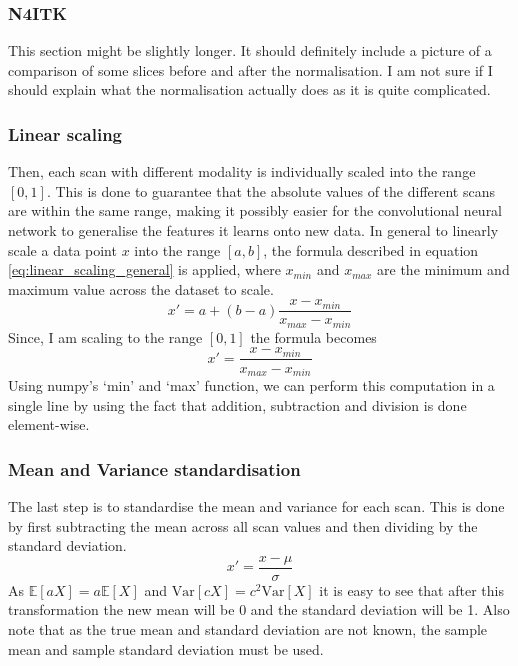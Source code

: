 \documentclass[12pt,a4paper,twoside,openright]{report}
\begin{document}
\subsubsection{N4ITK}
This section might be slightly longer. It should definitely include a picture of a comparison of some slices before and after the normalisation. I am not sure if I should explain what the normalisation actually does as it is quite complicated.

\subsubsection{Linear scaling}
Then, each scan with different modality is individually scaled into the range $[0,1]$. This is done to guarantee that the absolute values of the different scans are within the same range, making it possibly easier for the convolutional neural network to generalise the features it learns onto new data. In general to linearly scale a data point $x$ into the range $[a, b]$, the formula described in equation \ref{eq:linear_scaling_general} is applied, where $x_{min}$ and $x_{max}$ are the minimum and maximum value across the dataset to scale.
\begin{equation}
	\label{eq:linear_scaling_general}
	x' = a + (b - a)\frac{x - x_{min}}{x_{max} - x_{min}}
\end{equation}
Since, I am scaling to the range $[0,1]$ the formula becomes
\begin{equation}
	x' = \frac{x - x_{min}}{x_{max} - x_{min}}
\end{equation}
Using numpy's `min' and `max' function, we can perform this computation in a single line by using the fact that addition, subtraction and division is done element-wise.

\subsubsection{Mean and Variance standardisation}
The last step is to standardise the mean and variance for each scan. This is done by first subtracting the mean across all scan values and then dividing by the standard deviation. 
\begin{equation}
	x' = \frac{x - \mu}{\sigma}
\end{equation}
As $\mathbb{E}[aX] = a \mathbb{E}[X]$ and $\textrm{Var} [cX] = c^2 \textrm{Var} [X]$ it is easy to see that after this transformation the new mean will be 0 and the standard deviation will be 1. Also note that as the true mean and standard deviation are not known, the sample mean and sample standard deviation must be used. 
\end{document}

